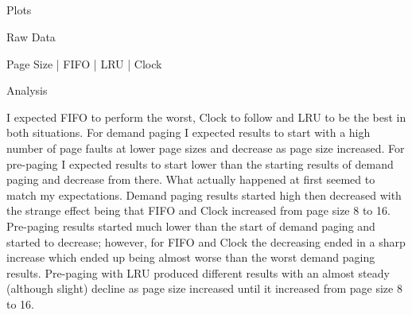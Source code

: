 \documentclass[11pt, letterpaper]{article}
\begin{document}
\\
\\
\noindent{\today}\\
\\

\begin{center}
    \Large{Plots}


    \Large{Raw Data}

    \footnotesize{Page Size | FIFO | LRU | Clock}
\end{center}

\begin{multicols}{2}
\end{multicols}

\bigskip

\begin{center}
    \Large{Analysis}
\end{center}

I expected FIFO to perform the worst, Clock to follow and LRU to be the best in both situations.
For demand paging I expected results to start with a high number of page faults at lower page sizes and decrease as page size increased.
For pre-paging I expected results to start lower than the starting results of demand paging and decrease from there.
What actually happened at first seemed to match my expectations.
Demand paging results started high then decreased with the strange effect being that FIFO and Clock increased from page size 8 to 16.
Pre-paging results started much lower than the start of demand paging and started to decrease; however, for FIFO and Clock the decreasing ended in a sharp increase which ended up being almost worse than the worst demand paging results.
Pre-paging with LRU produced different results with an almost steady (although slight) decline as page size increased until it increased from page size 8 to 16.
\end{document}
